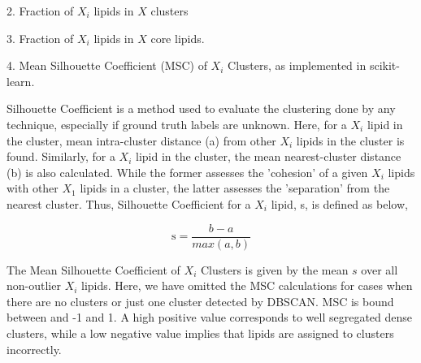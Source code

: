 \documentclass{biophys-new}
\begin{document}
2. Fraction of $X_i$ lipids in $X$ clusters

3. Fraction of $X_i$ lipids in $X$ core lipids.

4. Mean Silhouette Coefficient (MSC) of $X_i$ Clusters, as implemented in scikit-learn.

Silhouette Coefficient is a method used to evaluate the clustering done by any technique, especially if ground truth labels are unknown. 
Here, for a $X_i$ lipid in the cluster, mean intra-cluster distance (a) from other $X_i$ lipids in the cluster is found.  
Similarly, for a $X_i$ lipid in the cluster, the mean nearest-cluster distance (b) is also calculated.
While the former assesses the 'cohesion' of a given $X_i$ lipids with other $X_1$ lipids in a cluster, the latter assesses the 'separation' from the nearest cluster.
Thus, Silhouette Coefficient for a $X_i$ lipid, s, is defined as below,

\begin{equation}
\label{eq:SC}
\text{s} = \frac{b - a}{max(a,b)}
\end{equation}

The Mean Silhouette Coefficient of $X_i$ Clusters is given by the mean $s$ over all non-outlier $X_i$ lipids.
Here, we have omitted the MSC calculations for cases when there are no clusters or just one cluster detected by DBSCAN. 
MSC is bound between and -1 and 1.
A high positive value corresponds to well segregated dense clusters, while a low negative value implies that lipids are assigned to clusters incorrectly.  
\end{document}
